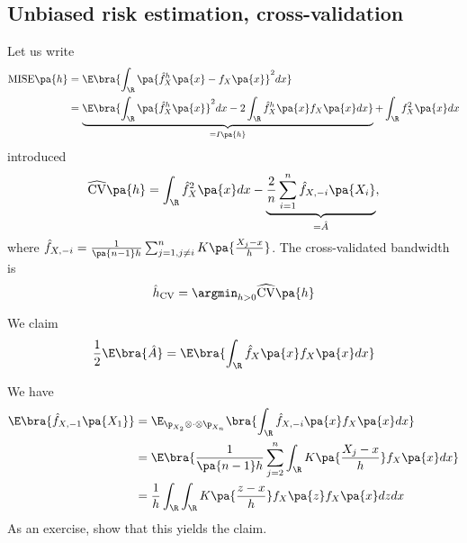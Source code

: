 \subsection{Unbiased risk estimation, cross-validation}
Let us write
\begin{equation}
\begin{split}
\mathrm{MISE}\pa{h} &= \E\bra{\int_\R \pa{\hat{f}^h_X\pa{x}-f_X\pa{x} }^2dx}\\
&= \underbrace{\E\bra{\int_\R \pa{\hat{f}^h_X \pa{x}}^2 dx - 2\int_\R \hat{f}^h_X\pa{x} f_X\pa{x}dx }}_{=I\pa{h}} + \int_\R f_X^2\pa{x}dx
\end{split}
\end{equation}
\cite{rudemo} introduced
\begin{equation}
  \widehat{\mathrm{CV}}\pa{h} = \int_\R \hat{f}_X^2 \pa{x}dx - \underbrace{\frac{2}{n} \sum_{i=1}^n \hat{f}_{X,-i}\pa{X_i}}_{=\hat{A}},
\end{equation}
where $\hat{f}_{X,-i} = \frac{1}{\pa{n-1}h} \sum_{j=1,j\neq i}^n K\pa{\frac{X_j-x}{h}}$. The cross-validated bandwidth is
\begin{equation}
  \hat{h}_{\mathrm{CV}} = \argmin_{h>0 }\widehat{\mathrm{CV}}\pa{h}
\end{equation}

We claim
\begin{equation}
  \frac{1}{2}\E\bra{\hat{A}}= \E\bra{\int_\R \hat{f}_X\pa{x} f_X\pa{x} dx}
\end{equation}

We have
\begin{equation}
\begin{split}
  \E\bra{\hat{f}_{X,-1}\pa{X_1}} &= \E_{\p_{X_2}\otimes  \cdot\otimes \p_{X_n}}\bra{\int_\R \hat{f}_{X,-i}\pa{x}f_X\pa{x} dx} \\
  &= \E\bra{\frac{1}{\pa{n-1} h}\sum_{j=2}^n \int_\R K\pa{\frac{X_j-x}{h}}f_X\pa{x} dx}\\
  &=\frac{1}{h} \int_\R\int_\R K\pa{\frac{z-x}{h}} f_X\pa{z} f_X\pa{x} dz dx
  \end{split}
\end{equation}
As an exercise, show that this yields the claim.

